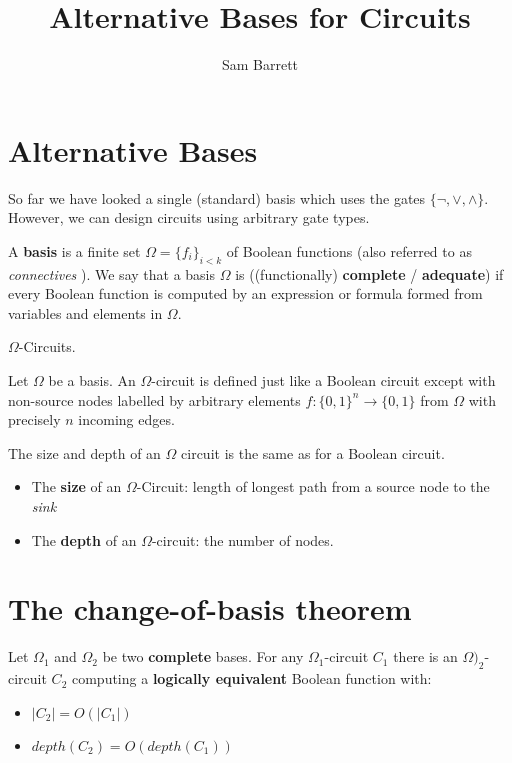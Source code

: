 \documentclass{article}
\title{Alternative Bases for Circuits}
\author{Sam Barrett}
\begin{document}
\maketitle

\section{Alternative Bases}

So far we have looked a single (standard) basis which uses the gates $\{ \neg , \vee, \wedge \} $. However, we can design circuits using arbitrary gate types.

\begin{definition}
  A \textbf{basis} is a finite set \(\Omega = \{ f_{i} \}_{i<k}\) of Boolean functions (also referred to as \textit{connectives} ). We say that a basis \(\Omega\) is ((functionally) \textbf{complete} / \textbf{adequate})  if every Boolean function is computed by an expression or formula formed from variables and elements in \(\Omega\).
\end{definition}

\begin{definition}
  \(\Omega\)-Circuits.

  Let \(\Omega\) be a basis. An \(\Omega\)-circuit is defined just like a Boolean circuit except with non-source nodes labelled by arbitrary elements  $f : \{0,1 \}^{n} \rightarrow \{ 0,1 \} $ from \(\Omega\) with precisely $n$ incoming edges.
\end{definition}

The size and depth of an \(\Omega\) circuit is the same as for a Boolean circuit.
\begin{itemize}
  \item The \textbf{size} of an \(\Omega\)-Circuit: length of longest path from a source node to the \textit{sink}
  \item The \textbf{depth} of an \(\Omega\)-circuit: the number of nodes.
\end{itemize}

\section{The change-of-basis theorem}

\begin{theorem}
  Let \(\Omega_{1}\) and \(\Omega_{2}\) be two \textbf{complete } bases. For any \(\Omega_{1}\)-circuit $C_{1}$ there is an \(\Omega)_{2}\)-circuit $C_{2}$ computing a \textbf{logically equivalent} Boolean function with:

  \begin{itemize}
    \item $|C_{2}| = O(|C_{1}|)$
    \item $depth(C_{2}) = O(depth(C_{1}))$
  \end{itemize}
\end{theorem}
\end{document}
